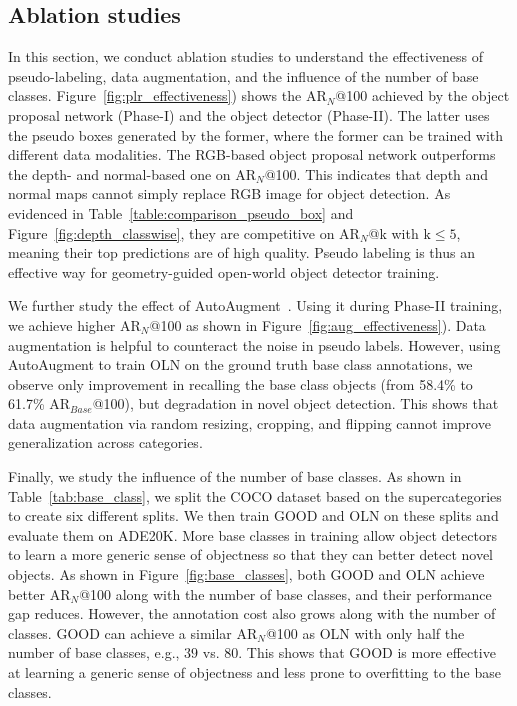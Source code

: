 \documentclass{article} \usepackage{iclr2023_conference,times}
\begin{document}
\subsection{Ablation studies}\label{sec:ablation}
In this section, we conduct ablation studies to understand the effectiveness of pseudo-labeling, data augmentation, and the influence of the number of base classes. Figure~\ref{fig:plr_effectiveness}) shows the AR$_N$@100 achieved by the object proposal network (Phase-I) and the object detector (Phase-II). The latter uses the pseudo boxes generated by the former, where the former can be trained with different data modalities. The RGB-based object proposal network outperforms the depth- and normal-based one on AR$_N$@100. This indicates that depth and normal maps cannot simply replace RGB image for object detection. As evidenced in Table~\ref{table:comparison_pseudo_box} and Figure~\ref{fig:depth_classwise}, they are competitive on AR$_N$@k with $\text{k}\leq 5$, meaning their top predictions are of high quality. Pseudo labeling is thus an effective way for geometry-guided open-world object detector training. 

We further study the effect of AutoAugment~\citep{cubuk2019autoaugment}. Using it during Phase-II training, we achieve higher AR$_{N}$@100 as shown in Figure~\ref{fig:aug_effectiveness}). Data augmentation is helpful to counteract the noise in pseudo labels. However, using AutoAugment to train OLN on the ground truth base class annotations, we observe only improvement in recalling the base class objects (from 58.4\% to 61.7\% AR$_{Base}$@100), but degradation in novel object detection. This shows that data augmentation via random resizing, cropping, and flipping cannot improve generalization across categories. 

Finally, we study the influence of the number of base classes. As shown in Table~\ref{tab:base_class}, we split the COCO dataset based on the supercategories to create six different splits. We then train GOOD and OLN on these splits and evaluate them on ADE20K. More base classes in training allow object detectors to learn a more generic sense of objectness so that they can better detect novel objects. As shown in Figure~\ref{fig:base_classes}, both GOOD and OLN achieve better  AR$_{N}$@100 along with the number of base classes, and their performance gap reduces. However, the annotation cost also grows along with the number of classes. GOOD can achieve a similar AR$_{N}$@100 as OLN with only half the number of base classes, e.g., $39$ vs. $80$. This shows that GOOD is more effective at learning a generic sense of objectness and less prone to overfitting to the base classes.
\end{document}
